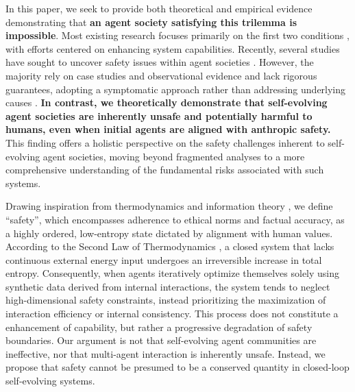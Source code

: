 \documentclass{article}
\theoremstyle{definition}
\theoremstyle{plain}
\begin{document}
In this paper, we seek to provide both theoretical and empirical evidence demonstrating that \textbf{an agent society satisfying this trilemma is impossible}. 
Most existing research focuses primarily on the first two conditions \cite{chen2025multi, wang2025ragen}, with efforts centered on enhancing system capabilities. 
Recently, several studies have sought to uncover safety issues within agent societies \cite{zhang2024agent, debenedetti2024agentdojo}. 
However, the majority rely on case studies and observational evidence and lack rigorous guarantees, adopting a symptomatic approach rather than addressing underlying causes \cite{zhan2025adaptive, motwani2024secret, doshi2026towards}.
\textbf{In contrast, we theoretically demonstrate that self-evolving agent societies are inherently unsafe and potentially harmful to humans, even when initial agents are aligned with anthropic safety. 
}
This finding offers a holistic perspective on the safety challenges inherent to self-evolving agent societies, moving beyond fragmented analyses to a more comprehensive understanding of the fundamental risks associated with such systems.

Drawing inspiration from thermodynamics and information theory \cite{ouyang2022training, parrondo2015thermodynamics}, we define ``safety'', which encompasses adherence to ethical norms and factual accuracy, as a highly ordered, low-entropy state dictated by alignment with human values. 
According to the Second Law of Thermodynamics \cite{lieb2000fresh}, a closed system that lacks continuous external energy input undergoes an irreversible increase in total entropy. 
Consequently, when agents iteratively optimize themselves solely using synthetic data derived from internal interactions, the system tends to neglect high-dimensional safety constraints, instead prioritizing the maximization of interaction efficiency or internal consistency.
This process does not constitute a enhancement of capability, but rather a progressive degradation of safety boundaries. 
Our argument is not that self-evolving agent communities are ineffective, nor that multi-agent interaction is inherently unsafe. Instead, we propose that safety cannot be presumed to be a conserved quantity in closed-loop self-evolving systems. 
\end{document}

